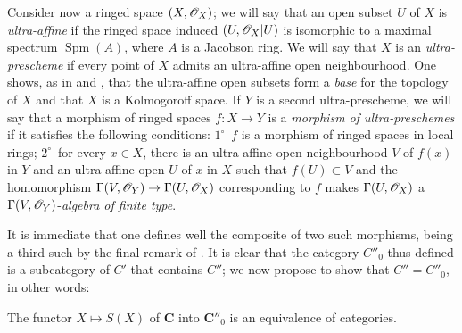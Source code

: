 
\begin{env}[10.9.5]
\label{IV.10.9.5}
Consider now a ringed space $(X,\mathscr{O}_X)$; we will say that an open subset $U$ of $X$ is \emph{ultra-affine} if the ringed space induced $(U,\mathscr{O}_X|U)$ is isomorphic to a maximal spectrum $\operatorname{Spm}(A)$, where $A$ is a Jacobson ring.
We will say that $X$ is an \emph{ultra-prescheme} if every point of $X$ admits an ultra-affine open neighbourhood.
One shows, as in  and , that the ultra-affine open subsets form a \emph{base} for the topology of $X$ and that $X$ is a Kolmogoroff space.
If $Y$ is a second ultra-prescheme, we will say that a morphism of ringed spaces $f:X\to Y$ is a \emph{morphism of ultra-preschemes} if it satisfies the following conditions: $1^\circ$~$f$ is a morphism of ringed spaces in local rings; $2^\circ$~for every $x\in X$, there is an ultra-affine open neighbourhood $V$ of $f(x)$ in $Y$ and an ultra-affine open $U$ of $x$ in $X$ such that $f(U)\subset V$ and the homomorphism $\Gamma(V,\mathscr{O}_Y)\to\Gamma(U,\mathscr{O}_X)$ corresponding to $f$ makes $\Gamma(U,\mathscr{O}_X)$ a $\Gamma(V,\mathscr{O}_Y)$-\emph{algebra of finite type}.

It is immediate that one defines well the composite of two such morphisms, being a third such by the final remark of .
It is clear that the category $C''_0$ thus defined is a subcategory of $C'$ that contains $C''$; we now propose to show that $C''=C''_0$, in other words:
\end{env}

\begin{proposition}[10.9.6]
\label{IV.10.9.6}
The functor $X\mapsto S(X)$ of $\mathbf{C}$ into $\mathbf{C}''_0$ is an equivalence of categories.
\end{proposition}

